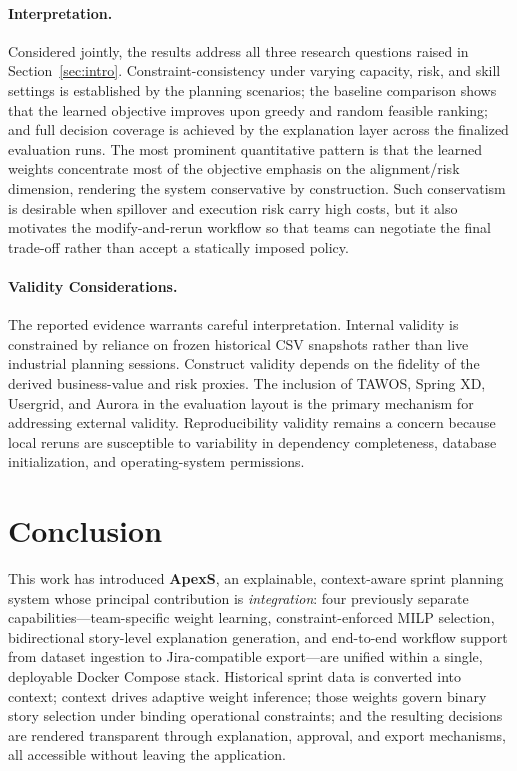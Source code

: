 \documentclass[conference]{IEEEtran}
\begin{document}
\paragraph{Interpretation.}
Considered jointly, the results address all three research questions raised in
Section~\ref{sec:intro}.
Constraint-consistency under varying capacity, risk, and skill settings is
established by the planning scenarios; the baseline comparison shows that the
learned objective improves upon greedy and random feasible ranking; and full decision
coverage is achieved by the explanation layer across the finalized evaluation runs.
The most prominent quantitative pattern is that the learned weights concentrate
most of the objective emphasis on the alignment/risk dimension, rendering the
system conservative by construction.
Such conservatism is desirable when spillover and execution risk carry high costs,
but it also motivates the modify-and-rerun workflow so that teams can negotiate the
final trade-off rather than accept a statically imposed policy.

\paragraph{Validity Considerations.}
The reported evidence warrants careful interpretation.
Internal validity is constrained by reliance on frozen historical CSV snapshots
rather than live industrial planning sessions.
Construct validity depends on the fidelity of the derived business-value and risk
proxies.
The inclusion of TAWOS, Spring XD, Usergrid, and Aurora in the evaluation layout is
the primary mechanism for addressing external validity.
Reproducibility validity remains a concern because local reruns are susceptible to
variability in dependency completeness, database initialization, and operating-system
permissions.

\section{Conclusion}
\label{sec:conclusion}

This work has introduced \textbf{ApexS}, an explainable, context-aware sprint
planning system whose principal contribution is \emph{integration}: four previously
separate capabilities---team-specific weight learning, constraint-enforced MILP
selection, bidirectional story-level explanation generation, and end-to-end workflow
support from dataset ingestion to Jira-compatible export---are unified within a
single, deployable Docker Compose stack.
Historical sprint data is converted into context; context drives adaptive weight
inference; those weights govern binary story selection under binding operational
constraints; and the resulting decisions are rendered transparent through explanation,
approval, and export mechanisms, all accessible without leaving the application.
\end{document}

